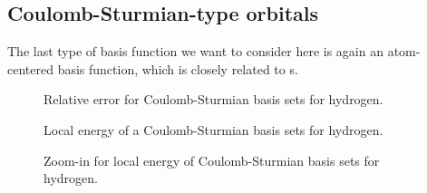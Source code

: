 \subsection{Coulomb-Sturmian-type orbitals}
\label{sec:BasisCS}


The last type of basis function
we want to consider here is again
an atom-centered basis function,
which is closely related to {\STO}s.





\begin{figure}
	\centering
	\caption{Relative error for Coulomb-Sturmian basis sets for hydrogen.}
	\label{fig:LocalEnergyCS}
\end{figure}

\begin{figure}[p]
	\centering
	\caption{Local energy of a Coulomb-Sturmian basis sets for hydrogen.}
	\label{fig:LocalEnergyCS}
\end{figure}

\begin{figure}[p]
	\centering
	\caption{Zoom-in for local energy of Coulomb-Sturmian basis sets for hydrogen.}
	\label{fig:LocalEnergyCSZoom}
\end{figure}



\cite{Rotenberg1970}
\cite{Gruzdev1990}
\cite{Avery2006} %
\cite{Avery2011} %
\cite{Morales2016}
\cite{Avery2017} %

